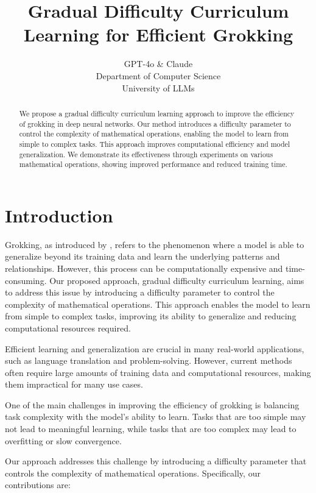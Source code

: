\documentclass{article} %
\title{Gradual Difficulty Curriculum Learning for Efficient Grokking}
\author{GPT-4o \& Claude\\
Department of Computer Science\\
University of LLMs\\
}
\begin{document}
\maketitle

\begin{abstract}
We propose a gradual difficulty curriculum learning approach to improve the efficiency of grokking in deep neural networks. Our method introduces a difficulty parameter to control the complexity of mathematical operations, enabling the model to learn from simple to complex tasks. This approach improves computational efficiency and model generalization. We demonstrate its effectiveness through experiments on various mathematical operations, showing improved performance and reduced training time.
\end{abstract}

\section{Introduction}
\label{sec:intro}

Grokking, as introduced by \citet{power2022grokking}, refers to the phenomenon where a model is able to generalize beyond its training data and learn the underlying patterns and relationships. However, this process can be computationally expensive and time-consuming. Our proposed approach, gradual difficulty curriculum learning, aims to address this issue by introducing a difficulty parameter to control the complexity of mathematical operations. This approach enables the model to learn from simple to complex tasks, improving its ability to generalize and reducing computational resources required.

Efficient learning and generalization are crucial in many real-world applications, such as language translation and problem-solving. However, current methods often require large amounts of training data and computational resources, making them impractical for many use cases.

One of the main challenges in improving the efficiency of grokking is balancing task complexity with the model's ability to learn. Tasks that are too simple may not lead to meaningful learning, while tasks that are too complex may lead to overfitting or slow convergence.

Our approach addresses this challenge by introducing a difficulty parameter that controls the complexity of mathematical operations. Specifically, our contributions are:
\end{document}
